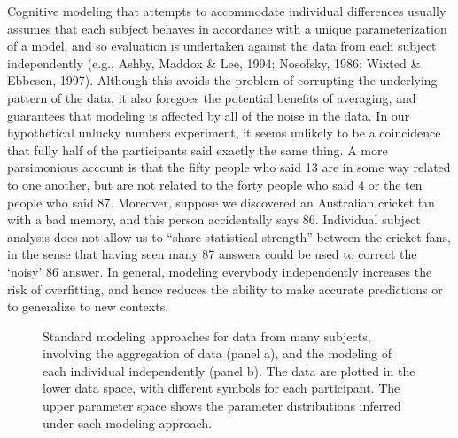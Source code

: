 \documentclass[authoryear]{elsarticle}
\newcommand{\bfc}{}
\newcommand{\efc}{\vspace*{15pt}}
\begin{document}
Cognitive modeling that attempts to accommodate individual
differences usually assumes that each subject behaves in accordance with a
unique parameterization of a model, and so
evaluation is undertaken against the data from each subject independently (e.g., Ashby,
Maddox \& Lee, 1994; Nosofsky, 1986; Wixted \& Ebbesen, 1997). Although
this avoids the problem of corrupting the underlying pattern of the data, it
also foregoes the potential benefits of averaging, and guarantees that modeling is
affected by all of the noise in the data. In our hypothetical unlucky numbers experiment,
it seems unlikely to be a coincidence that
fully half of the participants said exactly the same thing. A more parsimonious
 account is that the fifty people who
said 13 are in some way related to one another, but are not related to the forty people who
said 4 or the ten people who said 87. Moreover, suppose we discovered an
Australian cricket fan with a bad memory, and this person accidentally says
86. Individual subject analysis does not allow us to ``share statistical strength''
between the cricket fans, in the sense that having seen many 87 answers could be used to
correct the `noisy' 86 answer. In general, modeling everybody independently increases
the risk of overfitting, and hence reduces the ability to make accurate predictions
or to generalize to new contexts.

\begin{figure}[t]
        \begin{center}
        \caption{\bfc Standard modeling approaches for data from many subjects, involving the aggregation of data (panel a), and the modeling of each individual independently (panel b).
        The data are plotted in the lower data space, with different symbols for each
        participant. The upper parameter space shows the parameter distributions inferred under each modeling approach.\efc}
        \label{conventionalview}
        \end{center}
\end{figure}
\end{document}

